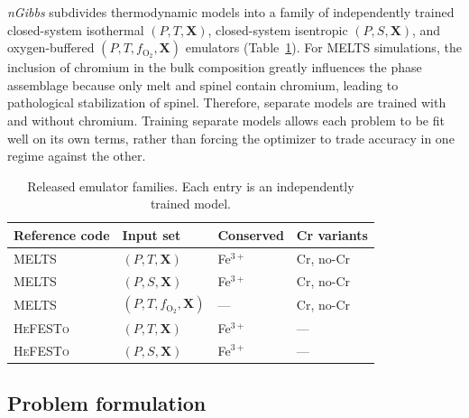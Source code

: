 \emph{nGibbs} subdivides thermodynamic models into a family of
independently trained closed-system isothermal $(P,T,\mathbf{X})$, closed-system isentropic
$(P,S,\mathbf{X})$, and oxygen-buffered $(P,T,f_{\mathrm{O}_2},\mathbf{X})$ emulators (Table~\ref{tab:families}). 
For MELTS simulations, the inclusion of chromium in the bulk composition greatly influences the phase 
assemblage because only melt and spinel contain chromium, leading to pathological stabilization of spinel. Therefore, separate 
models are trained with and without chromium. 
Training separate models allows each problem to be fit well on its own terms, rather than forcing the optimizer to trade accuracy in
one regime against the other.

\begin{table}[t]
\centering
\caption{Released emulator families. Each entry is an independently trained model.}
\label{tab:families}
\begin{tabular}{llll}
\toprule
Reference code & Input set & Conserved & Cr variants \\
\midrule
\textsc{MELTS} & $(P,T,\mathbf{X})$                    & Fe$^{3+}$ & Cr, no-Cr \\
\textsc{MELTS} & $(P,S,\mathbf{X})$                    & Fe$^{3+}$ & Cr, no-Cr \\
\textsc{MELTS} & $(P,T,f_{\mathrm{O}_2},\mathbf{X})$   & ---       & Cr, no-Cr \\
\textsc{HeFESTo} & $(P,T,\mathbf{X})$                  & Fe$^{3+}$ & --- \\
\textsc{HeFESTo} & $(P,S,\mathbf{X})$                  & Fe$^{3+}$ & --- \\
\bottomrule
\end{tabular}
\end{table}


\subsection{Problem formulation}
\label{sec:formulation}


